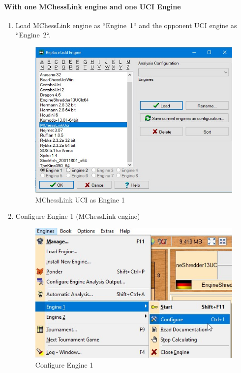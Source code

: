 \documentclass[11pt,a4paper]{article}
\begin{document}
\paragraph{With one MChessLink engine and one UCI Engine}
\begin{enumerate}
\item Load MChessLink engine as \mbox{``Engine 1``} and the opponent UCI engine as \mbox{``Engine 2``}.
	\begin{figure}[H]
	\centering
	\includegraphics[scale=0.7]{arena_engine1.jpg}
	\caption{MChessLink UCI as Engine 1}
	\label{fig:ArenaEngine1}
\end{figure}
\item Configure Engine 1 (MChessLink engine)
\begin{figure}[H]
	\centering
	\includegraphics[scale=0.6]{arena_configureengine1.jpg}
	\caption{Configure Engine 1}
	\label{fig:ArenaConfigureEngine1}

\end{figure}
\end{enumerate}
\end{document}
